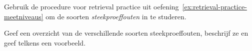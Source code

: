 \begin{exercise}
  Gebruik de procedure voor retrieval practice uit oefening~\ref{ex:retrieval-practice-meetniveaus} om de soorten \emph{steekproeffouten} in te studeren.
  
  Geef een overzicht van de verschillende soorten steekproeffouten, beschrijf ze en geef telkens een voorbeeld.
\end{exercise}